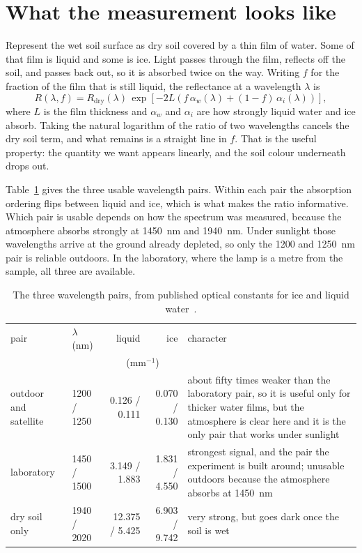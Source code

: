 \documentclass[11pt]{article}
\begin{document}
\section{What the measurement looks like}

Represent the wet soil surface as dry soil covered by a thin film of water. Some
of that film is liquid and some is ice. Light passes through the film, reflects
off the soil, and passes back out, so it is absorbed twice on the way. Writing
$f$ for the fraction of the film that is still liquid, the reflectance at a
wavelength $\lambda$ is
\[
R(\lambda,f)=R_{\mathrm{dry}}(\lambda)\,
\exp\!\left[-2L\left(f\,\alpha_w(\lambda)+(1-f)\,\alpha_i(\lambda)\right)\right],
\]
where $L$ is the film thickness and $\alpha_w$ and $\alpha_i$ are how strongly
liquid water and ice absorb. Taking the natural logarithm of the ratio of two
wavelengths cancels the dry soil term, and what remains is a straight line in
$f$. That is the useful property: the quantity we want appears linearly, and the
soil colour underneath drops out.

Table~\ref{tab:tiers} gives the three usable wavelength pairs. Within each pair
the absorption ordering flips between liquid and ice, which is what makes the
ratio informative. Which pair is usable depends on how the spectrum was
measured, because the atmosphere absorbs strongly at \SI{1450}{\nano\meter} and
\SI{1940}{\nano\meter}. Under sunlight those wavelengths arrive at the ground
already depleted, so only the \num{1200} and \SI{1250}{\nano\meter} pair is
reliable outdoors. In the laboratory, where the lamp is a metre from the sample,
all three are available.

\begin{table}[h]
\centering\small
\caption{The three wavelength pairs, from published optical constants for ice
and liquid water~\cite{Warren_2008,Segelstein_1981}.}
\label{tab:tiers}
\begin{tabular}{p{2.1cm}lrrp{5.4cm}}
\toprule
pair & $\lambda$ (nm) & liquid & ice & character \\
     &                & \multicolumn{2}{c}{($\mathrm{mm}^{-1}$)} & \\
\midrule
outdoor and satellite & 1200 / 1250 & 0.126 / 0.111 & 0.070 / 0.130 & about fifty times weaker than the laboratory pair, so it is useful only for thicker water films, but the atmosphere is clear here and it is the only pair that works under sunlight \\
\addlinespace
laboratory & 1450 / 1500 & 3.149 / 1.883 & 1.831 / 4.550 & strongest signal, and the pair the experiment is built around; unusable outdoors because the atmosphere absorbs at \SI{1450}{\nano\meter} \\
\addlinespace
dry soil only & 1940 / 2020 & 12.375 / 5.425 & 6.903 / 9.742 & very strong, but goes dark once the soil is wet \\
\bottomrule
\end{tabular}
\end{table}
\end{document}
